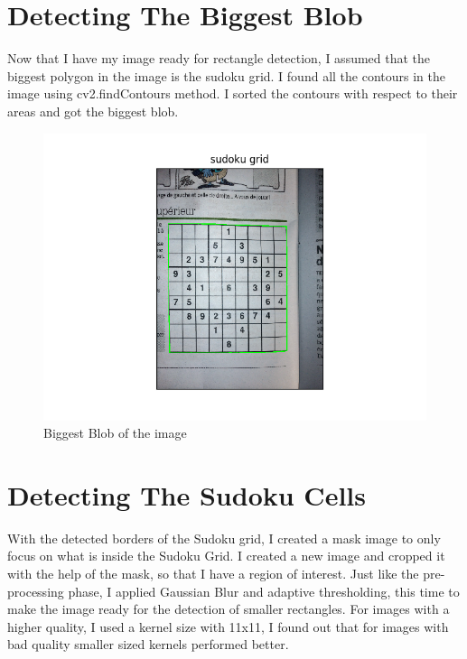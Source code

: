 \newpage

\section*{Detecting The Biggest Blob}

Now that I have my image ready for rectangle detection, I assumed that the biggest polygon in the image is the sudoku grid. I found all the contours in the image using cv2.findContours method. I sorted the contours with respect to their areas and got the biggest blob.

\begin{figure}[H]
    \centering
    \includegraphics[width=\textwidth]{images/extracted_grid.png}
    \caption{Biggest Blob of the image}
    \setlength{\belowcaptionskip}{-20pt}
    \setlength{\abovecaptionskip}{-20pt}
\end{figure}

\newpage

\section*{Detecting The Sudoku Cells}

With the detected borders of the Sudoku grid, I created a mask image to only focus on what is inside the Sudoku Grid. I created a new image and cropped it with the help of the mask, so that I have a region of interest. Just like the pre-processing phase, I applied Gaussian Blur and adaptive thresholding, this time to make the image ready for the detection of smaller rectangles. For images with a higher quality, I used a kernel size with 11x11, I found out that for images with bad quality
smaller sized kernels performed better.


